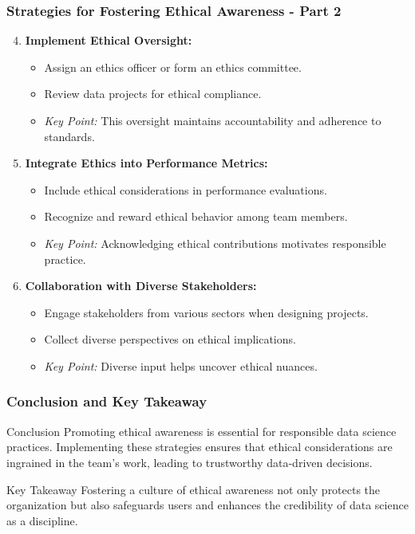 \documentclass[aspectratio=169]{beamer}
\begin{document}
\begin{frame}[fragile]
    \frametitle{Strategies for Fostering Ethical Awareness - Part 2}
    \begin{enumerate}
        \setcounter{enumi}{3}
        
        \item \textbf{Implement Ethical Oversight:}
        \begin{itemize}
            \item Assign an ethics officer or form an ethics committee.
            \item Review data projects for ethical compliance.
            \item \textit{Key Point:} This oversight maintains accountability and adherence to standards.
        \end{itemize}

        \item \textbf{Integrate Ethics into Performance Metrics:}
        \begin{itemize}
            \item Include ethical considerations in performance evaluations.
            \item Recognize and reward ethical behavior among team members.
            \item \textit{Key Point:} Acknowledging ethical contributions motivates responsible practice.
        \end{itemize}

        \item \textbf{Collaboration with Diverse Stakeholders:}
        \begin{itemize}
            \item Engage stakeholders from various sectors when designing projects.
            \item Collect diverse perspectives on ethical implications.
            \item \textit{Key Point:} Diverse input helps uncover ethical nuances.
        \end{itemize}
    \end{enumerate}
\end{frame}

\begin{frame}[fragile]
    \frametitle{Conclusion and Key Takeaway}
    \begin{block}{Conclusion}
        Promoting ethical awareness is essential for responsible data science practices. Implementing these strategies ensures that ethical considerations are ingrained in the team's work, leading to trustworthy data-driven decisions.
    \end{block}
    
    \begin{block}{Key Takeaway}
        Fostering a culture of ethical awareness not only protects the organization but also safeguards users and enhances the credibility of data science as a discipline.
    \end{block}
\end{frame}
\end{document}

